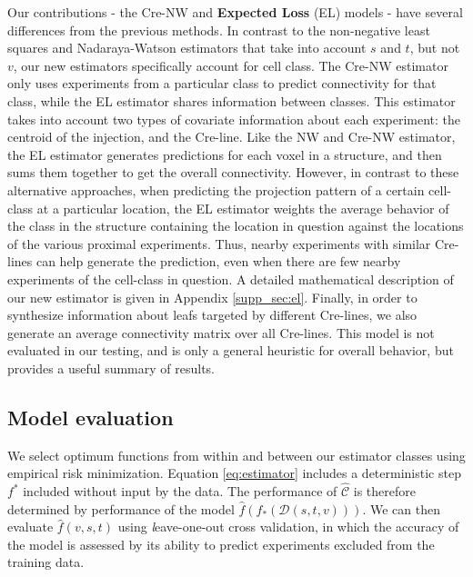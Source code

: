 Our contributions - the Cre-NW and \textbf{Expected Loss} (EL) models - have several differences from the previous methods.
In contrast to the \citet{Oh2014-kh} non-negative least squares and \citet{Knox2019-ot} Nadaraya-Watson estimators that take into account $s$ and $t$, but not $v$, our new estimators specifically account for cell class.
The Cre-NW estimator only uses experiments from a particular class to predict connectivity for that class, while the EL estimator shares information between classes.
This estimator takes into account two types of covariate information about each experiment: the centroid of the injection, and the Cre-line.
Like the NW and Cre-NW estimator, the EL estimator generates predictions for each voxel in a structure, and then sums them together to get the overall connectivity.
However, in contrast to these alternative approaches, when predicting the projection pattern of a certain cell-class at a particular location, the EL estimator weights the average behavior of the class in the structure containing the location in question against the locations of the various proximal experiments. 
Thus, nearby experiments with similar Cre-lines can help generate the prediction, even when there are few nearby experiments of the cell-class in question.
A detailed mathematical description of our new estimator is given in Appendix \ref{supp_sec:el}.
Finally, in order to synthesize information about leafs targeted by different Cre-lines, we also generate an average connectivity matrix over all Cre-lines.
This model is not evaluated in our testing, and is only a general heuristic for overall behavior, but provides a useful summary of results.


\newpage

\subsection{Model evaluation}

We select optimum functions from within and between our estimator classes using empirical risk minimization.
Equation \ref{eq:estimator}  includes a deterministic step $f^*$ included without input by the data.
The performance of $\widehat {\mathcal C}$ is therefore determined by performance of the model $\widehat f (f_*(\mathcal D(s,t,v)))$.
We can then evaluate $\widehat f(v,s,t)$ using {\textit leave-one-out cross validation}, in which the accuracy of the model is assessed by its ability to predict experiments excluded from the training data.

